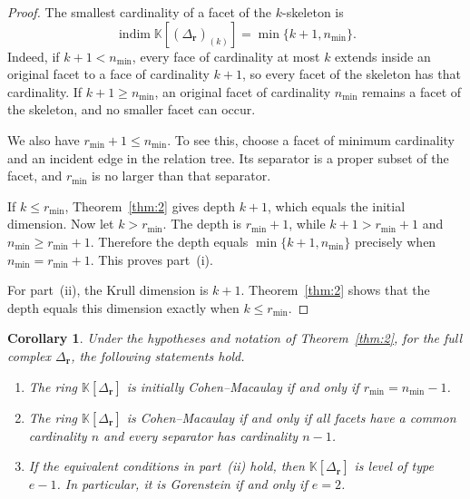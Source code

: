 \documentclass[11pt]{amsart}
\newtheorem{corollary}[theorem]{Corollary}
\theoremstyle{definition}
\theoremstyle{remark}
\newcommand{\K}{\mathbb K}
\newcommand{\SR}[1]{\K[#1]}
\DeclareMathOperator{\indim}{indim}
\begin{document}
	\begin{proof}
		The smallest cardinality of a facet of the $k$-skeleton is
		\[
		\indim\SR{(\Delta_{\mathbf r})_{(k)}}=\min\{k+1,n_{\min}\}.
		\]
		Indeed, if $k+1<n_{\min}$, every face of cardinality at most $k$ extends inside an original facet to a face of cardinality $k+1$, so every facet of the skeleton has that cardinality. If $k+1\ge n_{\min}$, an original facet of cardinality $n_{\min}$ remains a facet of the skeleton, and no smaller facet can occur.
		
		We also have $r_{\min}+1\le n_{\min}$. To see this, choose a facet of minimum cardinality and an incident edge in the relation tree. Its separator is a proper subset of the facet, and $r_{\min}$ is no larger than that separator.
		
		If $k\le r_{\min}$, Theorem~\ref{thm:2} gives depth $k+1$, which equals the initial dimension. Now let $k>r_{\min}$. The depth is $r_{\min}+1$, while $k+1>r_{\min}+1$ and $n_{\min}\ge r_{\min}+1$. Therefore the depth equals $\min\{k+1,n_{\min}\}$ precisely when $n_{\min}=r_{\min}+1$. This proves part~(i).
		
		For part~(ii), the Krull dimension is $k+1$. Theorem~\ref{thm:2} shows that the depth equals this dimension exactly when $k\le r_{\min}$.
	\end{proof}
	
	\begin{corollary}\label{cor:4}
		Under the hypotheses and notation of Theorem~\ref{thm:2}, for the full complex $\Delta_{\mathbf r}$, the following statements hold.
		\begin{enumerate}
			\item[(i)] The ring $\SR{\Delta_{\mathbf r}}$ is initially Cohen--Macaulay if and only if $r_{\min}=n_{\min}-1$.
			\item[(ii)] The ring $\SR{\Delta_{\mathbf r}}$ is Cohen--Macaulay if and only if all facets have a common cardinality $n$ and every separator has cardinality $n-1$.
			\item[(iii)] If the equivalent conditions in part~(ii) hold, then $\SR{\Delta_{\mathbf r}}$ is level of type $e-1$. In particular, it is Gorenstein if and only if $e=2$.
		\end{enumerate}
	\end{corollary}
	
\end{document}
